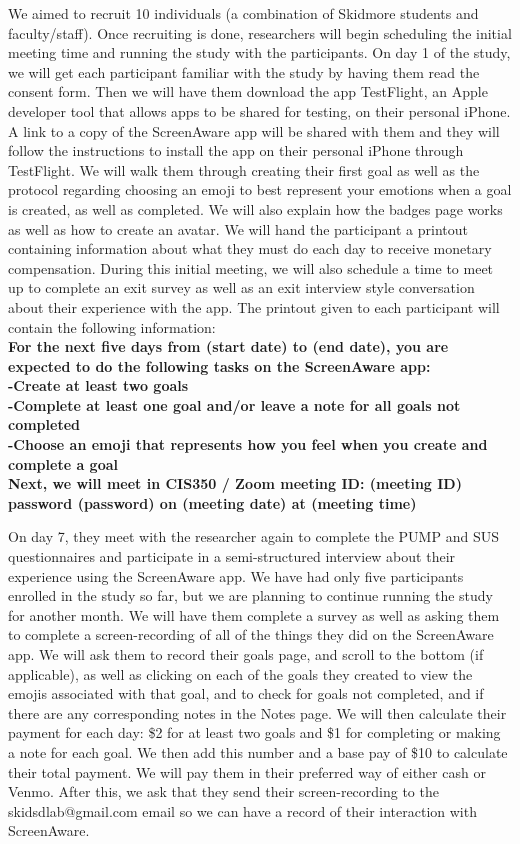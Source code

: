 \documentclass[12pt, title page, manuscript, nonacm]{acmart}
\begin{document}
We aimed to recruit 10 individuals (a combination of Skidmore students and faculty/staff). Once recruiting is done, researchers will begin scheduling the initial meeting time and running the study with the participants. On day 1 of the study, we will get each participant familiar with the study by having them read the consent form. Then we will have them download the app TestFlight, an Apple developer tool that allows  apps to be shared for testing, on their personal iPhone. A link to a copy of the ScreenAware app will be shared with them and they will follow the instructions to install the app on their personal iPhone through TestFlight. We will walk them through creating their first goal as well as the protocol regarding choosing an emoji to best represent your emotions when a goal is created, as well as completed. We will also explain how the badges page works as well as how to create an avatar. We will hand the participant a printout containing information about what they must do each day to receive monetary compensation. During this initial meeting, we will also schedule a time to meet up to complete an exit survey as well as an exit interview style conversation about their experience with the app. The printout given to each participant will contain the following information:
\\ \textbf{For the next five days from (start date) to (end date), you are expected to do the following tasks on the ScreenAware app: \\ -Create at least two goals \\ -Complete at least one goal and/or leave a note for all goals not completed \\ -Choose an emoji that represents how you feel when you create and complete a goal \\ Next, we will meet in CIS350 / Zoom meeting ID: (meeting ID) password (password) on (meeting date) at (meeting time)}
\par On day 7, they meet with the researcher again to complete the PUMP and SUS questionnaires and participate in a semi-structured interview about their experience using the ScreenAware app. We have had only five participants enrolled in the study so far, but we are planning to continue running the study for another month. We will have them complete a survey as well as asking them to complete a screen-recording of all of the things they did on the ScreenAware app. We will ask them to record their goals page, and scroll to the bottom (if applicable), as well as clicking on each of the goals they created to view the emojis associated with that goal, and to check for goals not completed, and if there are any corresponding notes in the Notes page. We will then calculate their payment for each day: \$2 for at least two goals and \$1 for completing or making a note for each goal. We then add this number and a base pay of \$10 to calculate their total payment. We will pay them in their preferred way of either cash or Venmo. After this, we ask that they send their screen-recording to the skidsdlab@gmail.com email so we can have a record of their interaction with ScreenAware.
\end{document}
